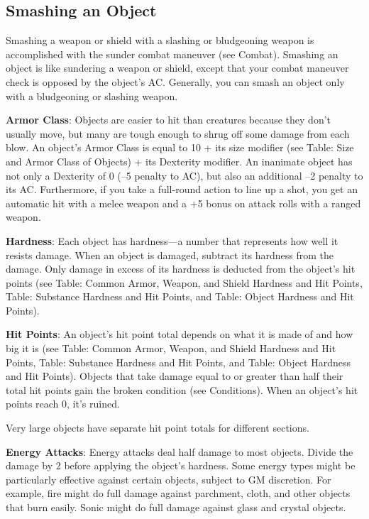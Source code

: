 \subsection{Smashing an Object}

			
Smashing a weapon or shield with a slashing or bludgeoning weapon is accomplished with the sunder combat maneuver (see Combat). Smashing an object is like sundering a weapon or shield, except that your combat maneuver check is opposed by the object's AC. Generally, you can smash an object only with a bludgeoning or slashing weapon.
			
\textbf{Armor Class}: Objects are easier to hit than creatures because they don't usually move, but many are tough enough to shrug off some damage from each blow. An object's Armor Class is equal to 10 + its size modifier (see Table: Size and Armor Class of Objects) + its Dexterity modifier. An inanimate object has not only a Dexterity of 0 (--5 penalty to AC), but also an additional --2 penalty to its AC. Furthermore, if you take a full-round action to line up a shot, you get an automatic hit with a melee weapon and a +5 bonus on attack rolls with a ranged weapon.
			
\textbf{Hardness}: Each object has hardness---a number that represents how well it resists damage. When an object is damaged, subtract its hardness from the damage. Only damage in excess of its hardness is deducted from the object's hit points (see Table: Common Armor, Weapon, and Shield Hardness and Hit Points, Table: Substance Hardness and Hit Points, and Table: Object Hardness and Hit Points).
			
\textbf{Hit Points}: An object's hit point total depends on what it is made of and how big it is (see Table: Common Armor, Weapon, and Shield Hardness and Hit Points, Table: Substance Hardness and Hit Points, and Table: Object Hardness and Hit Points). Objects that take damage equal to or greater than half their total hit points gain the broken condition (see Conditions). When an object's hit points reach 0, it's ruined.
			
Very large objects have separate hit point totals for different sections.
			
\textbf{Energy Attacks}: Energy attacks deal half damage to most objects. Divide the damage by 2 before applying the object's hardness. Some energy types might be particularly effective against certain objects, subject to GM discretion. For example, fire might do full damage against parchment, cloth, and other objects that burn easily. Sonic might do full damage against glass and crystal objects.
			
